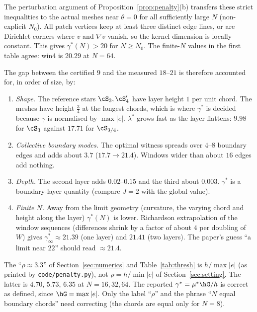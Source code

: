 The perturbation argument of Proposition~\ref{prop:penalty}(b) transfers these strict inequalities to the actual meshes near
$\theta=0$ for all sufficiently large $N$ (non-explicit $N_0$). All patch vertices keep at least three distinct edge lines, or
are Dirichlet corners where $v$ and $\nabla v$ vanish, so the kernel dimension is locally constant. This gives
$\gamma^\ast(N)>20$ for $N\ge N_0$. The finite-$N$ values in the first table agree: win4 is $20.29$ at $N=64$.

The gap between the certified $9$ and the measured $18$--$21$ is therefore accounted for, in order of size, by:
\begin{enumerate}
\item \emph{Shape.} The reference stars $\cS_3,\cS_4'$ have layer height $1$ per unit chord. The meshes have height $\frac34$ at the
longest chords, which is where $\gamma^\ast$ is decided because $\gamma$ is normalised by $\max|e|$. $\lambda^\ast$ grows fast as the
layer flattens: $9.98$ for $\cS_3$ against $17.71$ for $\cS_{3/4}$.
\item \emph{Collective boundary modes.} The optimal witness spreads over $4$--$8$ boundary edges and adds about $3.7$
($17.7\to21.4$). Windows wider than about $16$ edges add nothing.
\item \emph{Depth.} The second layer adds $0.02$--$0.15$ and the third about $0.003$. $\gamma^\ast$ is a boundary-layer quantity
(compare $J=2$ with the global value).
\item \emph{Finite $N$.} Away from the limit geometry (curvature, the varying chord and height along the layer) $\gamma^\ast(N)$ is
lower. Richardson extrapolation of the window sequences (differences shrink by a factor of about $4$ per doubling of $W$) gives
$\gamma^\ast_\infty\approx21.39$ (one layer) and $21.41$ (two layers). The paper's guess ``a limit near $22$'' should read
$\approx21.4$.
\end{enumerate}

\begin{remark}\label{pb:rho-label}
The ``$\rho\approx3.3$'' of Section~\ref{sec:numerics} and Table~\ref{tab:thresh} is $h/\max|e|$ (as printed by
\texttt{code/penalty.py}), not $\rho=h/\min|e|$ of Section~\ref{sec:setting}. The latter is $4.70$, $5.73$, $6.35$ at $N=16,32,64$.
The reported $\gamma^\ast=\mu^\ast\hG/h$ is correct as defined, since $\hG=\max|e|$. Only the label ``$\rho$'' and the phrase
``$N$ equal boundary chords'' need correcting (the chords are equal only for $N=8$).
\end{remark}

